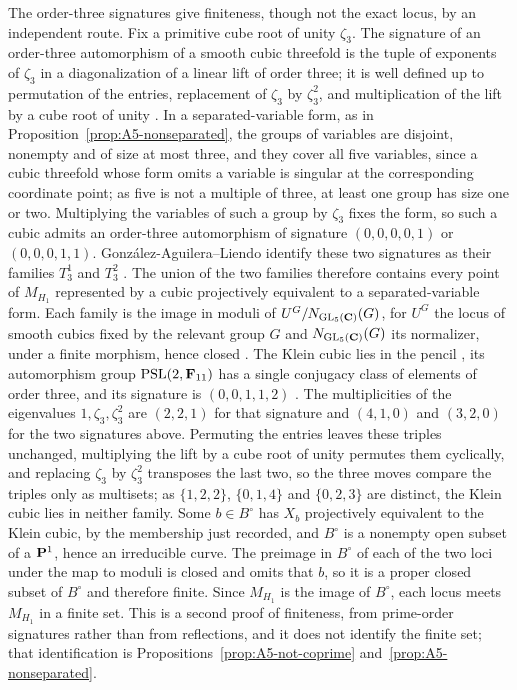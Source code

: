 The order-three signatures give finiteness, though not the exact locus, by an
independent route.  Fix a primitive cube root of unity \(\zeta_3\).  The signature
of an order-three automorphism of a smooth cubic threefold is the tuple of
exponents of \(\zeta_3\) in a diagonalization of a linear lift of order three;
it is well defined up to permutation of the entries, replacement of
\(\zeta_3\) by \(\zeta_3^2\), and multiplication of the lift by a cube root of
unity \cite[Definition~2.1]{GonzalezAguileraLiendo}.  In a separated-variable
form, as in Proposition~\ref{prop:A5-nonseparated}, the groups of variables
are disjoint, nonempty and of size at most three, and they cover all five
variables, since a cubic threefold whose form omits a variable is singular at
the corresponding coordinate point; as five is not a multiple of three, at
least one group has size one or two.  Multiplying the variables of such a
group by \(\zeta_3\) fixes the form, so such a cubic admits an
order-three automorphism of signature \((0,0,0,0,1)\) or \((0,0,0,1,1)\).
Gonz\'alez-Aguilera--Liendo identify these two signatures as their families
\(T_3^1\) and \(T_3^2\) \cite[Theorem~2.5]{GonzalezAguileraLiendo}.  The union
of the two families therefore contains every point of \(M_{H_1}\) represented
by a cubic projectively equivalent to a separated-variable form.  Each family
is the image in
moduli of \(U^G/N_{\operatorname{GL}_5(\mathbf C)}(G)\), for \(U^G\) the locus of
smooth cubics fixed by the relevant group \(G\) and
\(N_{\operatorname{GL}_5(\mathbf C)}(G)\) its normalizer, under a finite morphism,
hence closed \cite[Lemmas~2.6--2.7]{Hartlieb}.  The
Klein cubic lies in the pencil \cite[Lemmas~2.6--2.7 and
Proposition~5.7]{Hartlieb}, its automorphism group
\(\operatorname{PSL}(2,\mathbf F_{11})\) has a single conjugacy class of elements of
order three, and its signature is \((0,0,1,1,2)\)
\cite[Proposition~2.6]{GonzalezAguileraLiendo}.  The multiplicities of the
eigenvalues \(1,\zeta_3,\zeta_3^2\) are \((2,2,1)\) for that signature and
\((4,1,0)\) and \((3,2,0)\) for the two signatures above.  Permuting the
entries leaves these triples unchanged, multiplying the lift by a cube root of
unity permutes them cyclically, and replacing \(\zeta_3\) by \(\zeta_3^2\)
transposes the last two, so the three moves compare the triples only as
multisets; as \(\{1,2,2\}\), \(\{0,1,4\}\) and \(\{0,2,3\}\) are distinct, the
Klein cubic lies in neither family.  Some \(b\in B^\circ\) has \(X_b\)
projectively equivalent to the Klein cubic, by the membership just recorded,
and \(B^\circ\) is a nonempty open subset of a \(\mathbf P^1\), hence an irreducible
curve.  The preimage in \(B^\circ\) of each of the two loci under the map to
moduli is closed and omits that \(b\), so it is a proper closed subset of
\(B^\circ\) and therefore finite.  Since \(M_{H_1}\) is the image of
\(B^\circ\), each locus meets \(M_{H_1}\) in a finite set.  This is a second
proof of finiteness, from prime-order signatures rather than from reflections,
and it does not identify the finite set; that identification is
Propositions~\ref{prop:A5-not-coprime} and~\ref{prop:A5-nonseparated}.

